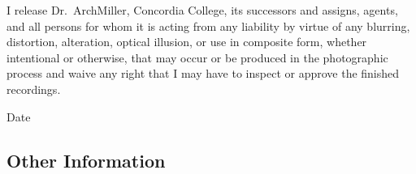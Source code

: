 \documentclass{tufte-handout}
\begin{document}
I release Dr.~ArchMiller, Concordia College, its successors and assigns, agents, and all persons for whom it is acting from any liability by virtue of any blurring, distortion, alteration, optical illusion, or use in composite form, whether intentional or otherwise, that may occur or be produced in the photographic process and waive any right that I may have to inspect or approve the finished recordings.

  \hrulefill
{}  \underline{\hspace{5cm}} {Date}  \hrulefill

\subsection{Other Information}

 \hrulefill

 \hrulefill

 \hrulefill

 \hrulefill


 \hrulefill

\hrulefill

\hrulefill

\hrulefill

\hrulefill

\hrulefill
\end{document}
